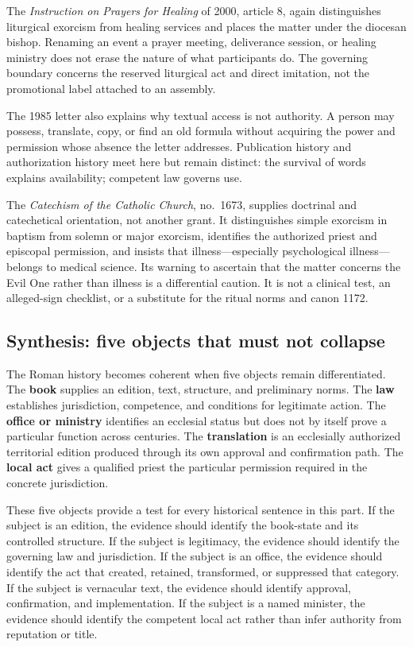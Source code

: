 The \emph{Instruction on Prayers for Healing} of 2000, article 8, again
distinguishes liturgical exorcism from healing services and places the matter
under the diocesan bishop. Renaming an event a prayer meeting, deliverance
session, or healing ministry does not erase the nature of what participants
do. The governing boundary concerns the reserved liturgical act and direct
imitation, not the promotional label attached to an assembly.

The 1985 letter also explains why textual access is not authority. A person
may possess, translate, copy, or find an old formula without acquiring the
power and permission whose absence the letter addresses. Publication history
and authorization history meet here but remain distinct: the survival of
words explains availability; competent law governs use.

The \emph{Catechism of the Catholic Church}, no.~1673, supplies doctrinal and
catechetical orientation, not another grant. It distinguishes simple exorcism
in baptism from solemn or major exorcism, identifies the authorized priest
and episcopal permission, and insists that illness---especially psychological
illness---belongs to medical science. Its warning to ascertain that the
matter concerns the Evil One rather than illness is a differential caution.
It is not a clinical test, an alleged-sign checklist, or a substitute for the
ritual norms and canon 1172.

\subsection{Synthesis: five objects that must not collapse}

The Roman history becomes coherent when five objects remain differentiated.
The \textbf{book} supplies an edition, text, structure, and preliminary norms.
The \textbf{law} establishes jurisdiction, competence, and conditions for
legitimate action. The \textbf{office or ministry} identifies an ecclesial
status but does not by itself prove a particular function across centuries.
The \textbf{translation} is an ecclesially authorized territorial edition
produced through its own approval and confirmation path. The \textbf{local
act} gives a qualified priest the particular permission required in the
concrete jurisdiction.

These five objects provide a test for every historical sentence in this part.
If the subject is an edition, the evidence should identify the book-state and
its controlled structure. If the subject is legitimacy, the evidence should
identify the governing law and jurisdiction. If the subject is an office, the
evidence should identify the act that created, retained, transformed, or
suppressed that category. If the subject is vernacular text, the evidence
should identify approval, confirmation, and implementation. If the subject is
a named minister, the evidence should identify the competent local act rather
than infer authority from reputation or title.

